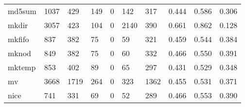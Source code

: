 \begin{longtable}{lp{1.3cm}p{1.3cm}p{1.3cm}p{1.3cm}p{1.3cm}p{1.3cm}p{1.3cm}p{1.3cm}p{1.3cm}}
md5sum    &                   1037 &                                429 &                               149 &                                0 &                               142 &                             317 &                                0.444 &                                  0.586 &                                0.306 \\
mkdir     &                   3057 &                                423 &                               104 &                                0 &                              2140 &                             390 &                                0.661 &                                  0.862 &                                0.128 \\
mkfifo    &                    837 &                                382 &                                75 &                                0 &                                59 &                             321 &                                0.459 &                                  0.544 &                                0.384 \\
mknod     &                    849 &                                382 &                                75 &                                0 &                                60 &                             332 &                                0.466 &                                  0.550 &                                0.391 \\
mktemp    &                    853 &                                402 &                                89 &                                0 &                                65 &                             297 &                                0.431 &                                  0.529 &                                0.348 \\
mv        &                   3668 &                               1719 &                               264 &                                0 &                               323 &                            1362 &                                0.455 &                                  0.531 &                                0.371 \\
nice      &                    741 &                                331 &                                69 &                                0 &                                52 &                             289 &                                0.466 &                                  0.553 &                                0.390 \\

\end{longtable}
